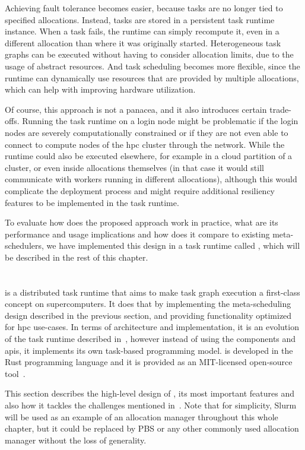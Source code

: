 Achieving fault tolerance becomes easier, because tasks are no longer tied to specified
allocations. Instead, tasks are stored in a persistent task runtime instance. When a task fails,
the runtime can simply recompute it, even in a different allocation than where it was originally
started. Heterogeneous task graphs can be executed without having to consider allocation limits,
due to the usage of abstract resources. And task scheduling becomes more flexible, since the
runtime can dynamically use resources that are provided by multiple allocations, which can help
with improving hardware utilization.

Of course, this approach is not a panacea, and it also introduces certain trade-offs. Running the
task runtime on a login node might be problematic if the login nodes are severely computationally
constrained or if they are not even able to connect to compute nodes of the \gls{hpc}
cluster through the network. While the runtime could also be executed elsewhere, for example in a
cloud partition of a cluster, or even inside allocations themselves (in that case it would still
communicate with workers running in different allocations), although this would complicate the
deployment process and might require additional resiliency features to be implemented in the task
runtime.

To evaluate how does the proposed approach work in practice, what are its performance and usage
implications and how does it compare to existing meta-schedulers, we have implemented this design
in a task runtime called \hyperqueue{}, which will be described in the rest of this
chapter.

\section{\hyperqueue{}}
\hyperqueue{} is a distributed task runtime that aims to make task graph execution a
first-class concept on supercomputers. It does that by implementing the meta-scheduling design
described in the previous section, and providing functionality optimized for \gls{hpc}
use-cases. In terms of architecture and implementation, it is an evolution of the
\rsds{} task runtime described in~, however instead of using
the \dask{} components and \glspl{api}, it implements its own task-based
programming model. \hyperqueue{} is developed in the Rust programming language and it is
provided as an \mbox{MIT-licensed} open-source tool~\cite{hq_github}.

This section describes the high-level design of \hyperqueue{}, its most important features
and also how it tackles the challenges mentioned in~. Note that for
simplicity, Slurm will be used as an example of an allocation manager throughout this whole
chapter, but it could be replaced by PBS or any other commonly used allocation manager without the
loss of generality.

